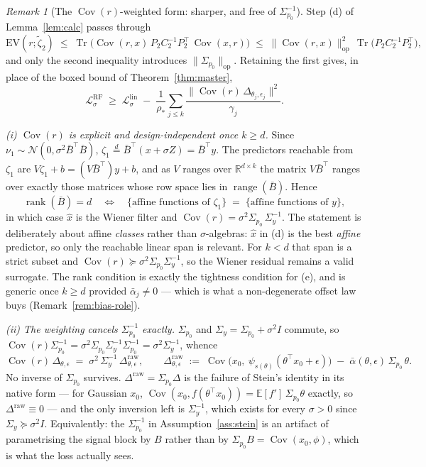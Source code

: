 \documentclass[11pt]{article}
\theoremstyle{remark}
\newtheorem{remark}{Remark}
\newcommand{\E}{\mathbb{E}}
\newcommand{\R}{\mathbb{R}}
\newcommand{\Tr}{\operatorname{Tr}}
\newcommand{\Cov}{\operatorname{Cov}}
\newcommand{\Sig}{\Sigma_{p_0}}
\newcommand{\Sy}{\Sigma_y}
\newcommand{\op}[1]{\lVert #1 \rVert_{\mathrm{op}}}
\begin{document}
\begin{remark}[The $\Cov(r)$-weighted form: sharper, and free of $\Sig^{-1}$]\label{rem:covr}
Step (d) of Lemma~\ref{lem:calc} passes through
\[
\mathrm{EV}(r;\tilde\zeta_2) \;\le\; \Tr\big(\Cov(r,x)\,P_2 C_2^{-1} P_2^\top\,\Cov(x,r)\big)
\;\le\; \op{\Cov(r,x)}^2\,\Tr\big(P_2C_2^{-1}P_2^\top\big),
\]
and only the second inequality introduces $\op{\Sig}$. Retaining the first gives, in place of the boxed bound of Theorem~\ref{thm:master},
\begin{equation}\label{eq:sharp-master}
\mathcal L^{\mathrm{RF}}_\sigma \;\ge\; \mathcal L^{\mathrm{lin}}_\sigma \;-\; \frac{1}{\rho_*}\sum_{j\le k}\frac{\big\lVert \Cov(r)\,\Delta_{\theta_j,\epsilon_j}\big\rVert^2}{\gamma_j}.
\end{equation}

\emph{(i) $\Cov(r)$ is explicit and design-independent once $k \ge d$.} Since $\nu_1 \sim \mathcal N(0,\sigma^2\bar B^\top\bar B)$, $\zeta_1 \overset{d}{=} \bar B^\top(x+\sigma Z) = \bar B^\top y$. The predictors reachable from $\zeta_1$ are $V\zeta_1 + b = (V\bar B^\top)y + b$, and as $V$ ranges over $\R^{d\times k}$ the matrix $V\bar B^\top$ ranges over exactly those matrices whose row space lies in $\operatorname{range}(\bar B)$. Hence
\[
\operatorname{rank}(\bar B) = d
\quad\Longleftrightarrow\quad
\{\text{affine functions of }\zeta_1\} \;=\; \{\text{affine functions of }y\},
\]
in which case $\hat x$ is the Wiener filter and $\Cov(r) = \sigma^2\Sig\,\Sy^{-1}$. The statement is deliberately about affine \emph{classes} rather than $\sigma$-algebras: $\hat x$ in (d) is the best \emph{affine} predictor, so only the reachable linear span is relevant. For $k<d$ that span is a strict subset and $\Cov(r) \succeq \sigma^2\Sig\Sy^{-1}$, so the Wiener residual remains a valid surrogate. The rank condition is exactly the tightness condition for (e), and is generic once $k\ge d$ provided $\bar\alpha_j \ne 0$ --- which is what a non-degenerate offset law buys (Remark~\ref{rem:bias-role}).

\emph{(ii) The weighting cancels $\Sig^{-1}$ exactly.} $\Sig$ and $\Sy = \Sig+\sigma^2 I$ commute, so $\Cov(r)\Sig^{-1} = \sigma^2\Sig\Sy^{-1}\Sig^{-1} = \sigma^2\Sy^{-1}$, whence
\begin{equation}\label{eq:invfree}
\Cov(r)\,\Delta_{\theta,\epsilon} \;=\; \sigma^{2}\,\Sy^{-1}\,\Delta^{\mathrm{raw}}_{\theta,\epsilon},
\qquad
\Delta^{\mathrm{raw}}_{\theta,\epsilon} \;:=\; \Cov\!\big(x_0,\ \psi_{s(\theta)}(\theta^\top x_0+\epsilon)\big) \;-\; \bar\alpha(\theta,\epsilon)\,\Sig\,\theta .
\end{equation}
No inverse of $\Sig$ survives. $\Delta^{\mathrm{raw}} = \Sig\Delta$ is the failure of Stein's identity in its native form --- for Gaussian $x_0$, $\Cov(x_0,f(\theta^\top x_0)) = \E[f']\,\Sig\theta$ exactly, so $\Delta^{\mathrm{raw}} \equiv 0$ --- and the only inversion left is $\Sy^{-1}$, which exists for every $\sigma>0$ since $\Sy \succeq \sigma^2 I$. Equivalently: the $\Sig^{-1}$ in Assumption~\ref{ass:stein} is an artifact of parametrising the signal block by $B$ rather than by $\Sig B = \Cov(x_0,\phi)$, which is what the loss actually sees.


\end{remark}
\end{document}
